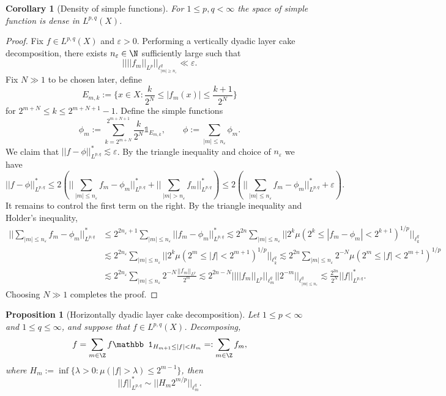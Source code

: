 \documentclass[reqno]{amsart}
\newtheorem{proposition}[theorem]{Proposition}
\newtheorem{corollary}[theorem]{Corollary}
\theoremstyle{definition}
\theoremstyle{remark}
\renewcommand{\epsilon}{\varepsilon}
\begin{document}
\begin{corollary}[Density of simple functions]
	For $1 \leq p, q < \infty$ the space of simple function is dense in $L^{p, q} (X)$. 
\end{corollary}

\begin{proof}
	Fix $f \in L^{p, q} (X)$ and $\epsilon > 0$. Performing a vertically dyadic layer cake decomposition, there exists $n_\epsilon \in \N$ sufficiently large such that 
		\[ \Big|\Big| ||f_m||_{L^p} \Big|\Big|_{\ell^q_{|m| \geq n_\epsilon}} \ll \epsilon. \]
	Fix $N \gg 1$ to be chosen later, define
		\[ E_{m, k} := \{ x \in X : \frac{k}{2^N} \leq |f_m(x)| \leq  \frac{k + 1}{2^N}  \} \]
	for $2^{m + N} \leq k \leq 2^{m + N + 1} - 1$. Define the simple functions
		\[ \phi_m := \sum_{k = 2^{m + N}}^{2^{m + N + 1}} \frac{k}{2^N} \mathbb 1_{E_{m, k}}, \qquad \phi := \sum_{|m| \leq n_\epsilon} \phi_m. \]
	We claim that $||f - \phi||_{L^{p,q}}^* \lesssim \epsilon$. By the triangle inequality and choice of $n_\epsilon$ we have
		\[ ||f - \phi||_{L^{p, q}}^* \leq 2 \left( \Big|\Big| \sum_{|m| \leq n_\epsilon} f_m - \phi_m \Big|\Big|_{L^{p, q}}^* + \Big|\Big| \sum_{|m| > n_\epsilon} f_m \Big| \Big|_{L^{p, q}}^* \right)  \leq 2 \left( \Big|\Big| \sum_{|m| \leq n_\epsilon} f_m - \phi_m \Big|\Big|_{L^{p, q}}^* + \epsilon \right).  \]
	It remains to control the first term on the right. By the triangle inequality and Holder's inequality, 
		\begin{align*}
			 \Big|\Big| \sum_{|m| \leq n_\epsilon} f_m - \phi_m \Big|\Big|_{L^{p, q}}^*
			 	&\leq 2^{2n_\epsilon + 1} \sum_{|m| \leq n_\epsilon} ||f_m - \phi_m||_{L^{p, q}}^* \lesssim 2^{2n} \sum_{|m| \leq n_\epsilon} \Big|\Big| 2^k \mu(2^k \leq |f_m - \phi_m| < 2^{k + 1})^{1/p} \Big|\Big|_{\ell^q_k} \\
			 	&\lesssim 2^{2n_\epsilon} \sum_{|m| \leq n_\epsilon} \Big|\Big| 2^k \mu(2^m \leq |f| < 2^{m + 1})^{1/p} \Big|\Big|_{\ell^q_k}  \lesssim 2^{2n} \sum_{|m| \leq n_\epsilon} 2^{-N} \mu(2^m \leq |f| < 2^{m + 1})^{1/p} \\
			 	&\lesssim 2^{2n_\epsilon} \sum_{|m| \leq n_\epsilon} 2^{-N} \frac{||f_m||_{L^p}}{2^m} \lesssim 2^{2n - N} \Big|\Big| ||f_m||_{L^p} \Big| \Big|_{\ell^q_m} \Big|\Big| 2^{-m} \Big| \Big|_{\ell^q_{|m| \leq n_\epsilon}} \lesssim \frac{2^{3n}}{2^N} ||f||_{L^{p, q}}^*.
		\end{align*}
	Choosing $N \gg 1$ completes the proof. 	
\end{proof}	


\begin{proposition}[Horizontally dyadic
layer cake decomposition]
	 Let $1 \leq p < \infty$ and $1 \leq q \leq \infty$, and suppose that $f \in L^{p, q} (X)$. Decomposing, 
	 	\[ f = \sum_{m \in \Z} f \mathbb 1_{H_{m + 1} \leq |f| < H_m} =: \sum_{m \in \Z} f_m, \]
	 where $H_m := \inf\{ \lambda > 0 : \mu ( |f| > \lambda) \leq 2^{m - 1} \}$, then
	 	\[ ||f||^*_{L^{p, q}} \sim ||H_m 2^{m/p}||_{\ell^q_m}. \]	
\end{proposition}
\end{document}
